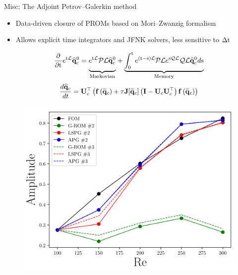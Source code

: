 \documentclass[]{beamer}
\begin{document}
\begin{frame}{Misc: The Adjoint Petrov--Galerkin method\footnotemark[13]}
	\begin{itemize}
		\item Data-driven closure of PROMs based on Mori--Zwanzig formalism
		\item Allows explicit time integrators and JFNK solvers, less sensitive to $\Delta \text{t}$
	\end{itemize}
	\begin{minipage}{0.49\linewidth}
		\scriptsize
		\begin{equation*}
			\pde{}{\timeVar} e^{\timeVar\MC{L}} \consVecCoef^0 = {\underbrace{\vphantom{ \int_0^{\timeVar} e^{(\timeVar-\text{s}) }} e^{\timeVar\MC{L}} \MC{PL} \consVecCoef^0}_{\text{Markovian}}} + \underbrace{\int_0^{\timeVar} e^{(\timeVar-\text{s}) \MC{L}} \MC{PL} e^{\text{s}\MC{QL}} \MC{QL}\consVecCoef^0 d\text{s}}_{\text{Memory}}
		\end{equation*}
		\begin{equation*}
			\frac{d \consVecCoef}{d t} = \consTrial^\top \left( \rhsFunc{\consVecRom} + \tau \mathbf{J}[\consVecRom] \left(\identMat - \consTrial \consTrial^\top \right) \rhsFunc{\consVecRom} \right)
		\end{equation*}
		\normalsize
	\end{minipage}
	\begin{minipage}{0.49\linewidth}
		\vspace{2em}
		\begin{figure}
			\includegraphics[width=0.8\linewidth]{misc/apg_cylinder.png}
		\end{figure}
	\end{minipage}
\end{frame}
\end{document}
